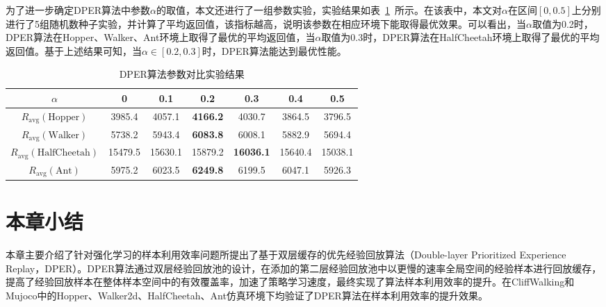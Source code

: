 为了进一步确定DPER算法中参数$\alpha$的取值，本文还进行了一组参数实验，实验结果如表~\ref{tab:dper-ablation}~所示。在该表中，本文对$\alpha$在区间$[0,0.5]$上分别进行了5组随机数种子实验，并计算了平均返回值，该指标越高，说明该参数在相应环境下能取得最优效果。可以看出，当$\alpha$取值为0.2时，DPER算法在Hopper、Walker、Ant环境上取得了最优的平均返回值，当$\alpha$取值为0.3时，DPER算法在HalfCheetah环境上取得了最优的平均返回值。基于上述结果可知，当$\alpha\in[0.2,0.3]$时，DPER算法能达到最优性能。

\begin{table}[ht]
\centering
\caption{DPER算法参数对比实验结果}
\begin{tabular}{ccccccc} 
\toprule
$\alpha$                           & 0       & 0.1     & 0.2             & 0.3              & 0.4     & 0.5      \\ 
\midrule
$R_\text{avg}(\text{Hopper})$      & 3985.4  & 4057.1  & \textbf{4166.2} & 4030.7           & 3864.5  & 3796.5   \\ 
$R_\text{avg}(\text{Walker})$      & 5738.2  & 5943.4  & \textbf{6083.8} & 6008.1           & 5882.9  & 5694.4   \\ 
$R_\text{avg}(\text{HalfCheetah})$ & 15479.5 & 15630.1 & 15879.2         & \textbf{16036.1} & 15640.4 & 15038.1  \\ 
$R_\text{avg}(\text{Ant})$         & 5975.2  & 6023.5  & \textbf{6249.8} & 6199.5           & 6047.1  & 5926.3   \\
\bottomrule
\end{tabular}


\label{tab:dper-ablation}
\end{table}

\section{本章小结}

本章主要介绍了针对强化学习的样本利用效率问题所提出了基于双层缓存的优先经验回放算法（Double-layer Prioritized Experience Replay，DPER）。DPER算法通过双层经验回放池的设计，在添加的第二层经验回放池中以更慢的速率全局空间的经验样本进行回放缓存，提高了经验回放样本在整体样本空间中的有效覆盖率，加速了策略学习速度，最终实现了算法样本利用效率的提升。在CliffWalking和Mujoco中的Hopper、Walker2d、HalfCheetah、Ant仿真环境下均验证了DPER算法在样本利用效率的提升效果。